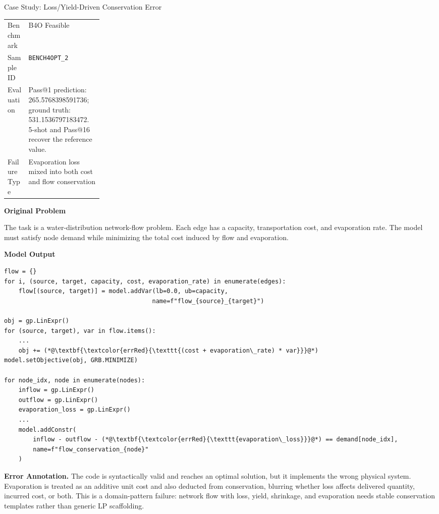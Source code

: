\begin{casepage}{Case Study: Loss/Yield-Driven Conservation Error}

\begin{tabularx}{\linewidth}{@{}p{0.22\linewidth}X@{}}
\toprule
Benchmark & B4O Feasible \\
Sample ID & \texttt{BENCH4OPT\_2} \\
Evaluation & Pass@1 prediction: 265.5768398591736; ground truth: 531.1536797183472. 5-shot and Pass@16 recover the reference value. \\
Failure Type & Evaporation loss mixed into both cost and flow conservation \\
\bottomrule
\end{tabularx}

\vspace{0.5em}
\textbf{Original Problem}

{\small
The task is a water-distribution network-flow problem. Each edge has a
capacity, transportation cost, and evaporation rate. The model must satisfy
node demand while minimizing the total cost induced by flow and evaporation.
\par}

\vspace{0.5em}
\textbf{Model Output}

\begin{lstlisting}[style=pythoncase]
flow = {}
for i, (source, target, capacity, cost, evaporation_rate) in enumerate(edges):
    flow[(source, target)] = model.addVar(lb=0.0, ub=capacity,
                                         name=f"flow_{source}_{target}")

obj = gp.LinExpr()
for (source, target), var in flow.items():
    ...
    obj += (*@\textbf{\textcolor{errRed}{\texttt{(cost + evaporation\_rate) * var}}}@*)
model.setObjective(obj, GRB.MINIMIZE)

for node_idx, node in enumerate(nodes):
    inflow = gp.LinExpr()
    outflow = gp.LinExpr()
    evaporation_loss = gp.LinExpr()
    ...
    model.addConstr(
        inflow - outflow - (*@\textbf{\textcolor{errRed}{\texttt{evaporation\_loss}}}@*) == demand[node_idx],
        name=f"flow_conservation_{node}"
    )
\end{lstlisting}

\vspace{0.3em}
\textbf{Error Annotation.}
The code is syntactically valid and reaches an optimal solution, but it
implements the wrong physical system. Evaporation is treated as an additive
unit cost and also deducted from conservation, blurring whether loss affects
delivered quantity, incurred cost, or both. This is a domain-pattern failure:
network flow with loss, yield, shrinkage, and evaporation needs stable
conservation templates rather than generic LP scaffolding.

\end{casepage}

